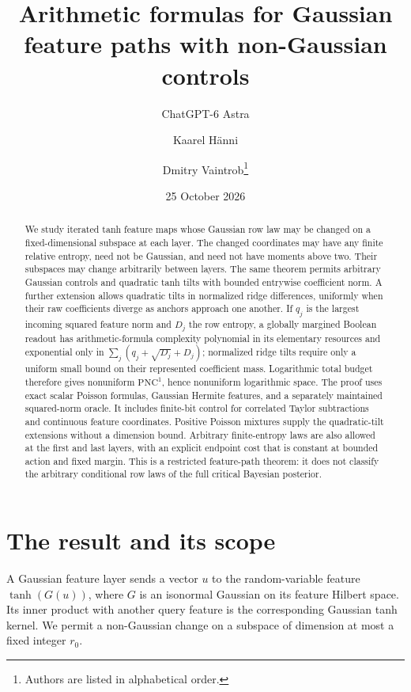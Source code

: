 \documentclass[11pt]{article}
\title{Arithmetic formulas for Gaussian feature paths with non-Gaussian controls}
\author{ChatGPT-6 Astra \and Kaarel H\"anni \and Dmitry Vaintrob\thanks{Authors are listed in alphabetical order.}}
\date{25 October 2026}
\newcommand{\PNC}{\mathrm{PNC}^{1}}
\begin{document}
\maketitle
\begin{abstract}
We study iterated tanh feature maps whose Gaussian row law may be changed on a fixed-dimensional subspace at each layer. The changed coordinates may have any finite relative entropy, need not be Gaussian, and need not have moments above two. Their subspaces may change arbitrarily between layers. The same theorem permits arbitrary Gaussian controls and quadratic tanh tilts with bounded entrywise coefficient norm. A further extension allows quadratic tilts in normalized ridge differences, uniformly when their raw coefficients diverge as anchors approach one another. If $q_j$ is the largest incoming squared feature norm and $D_j$ the row entropy, a globally margined Boolean readout has arithmetic-formula complexity polynomial in its elementary resources and exponential only in $\sum_j(q_j+\sqrt{D_j}+D_j)$; normalized ridge tilts require only a uniform small bound on their represented coefficient mass. Logarithmic total budget therefore gives nonuniform $\PNC$, hence nonuniform logarithmic space. The proof uses exact scalar Poisson formulas, Gaussian Hermite features, and a separately maintained squared-norm oracle. It includes finite-bit control for correlated Taylor subtractions and continuous feature coordinates. Positive Poisson mixtures supply the quadratic-tilt extensions without a dimension bound. Arbitrary finite-entropy laws are also allowed at the first and last layers, with an explicit endpoint cost that is constant at bounded action and fixed margin. This is a restricted feature-path theorem: it does not classify the arbitrary conditional row laws of the full critical Bayesian posterior.
\end{abstract}

\section{The result and its scope}
A Gaussian feature layer sends a vector $u$ to the random-variable feature $\tanh(G(u))$, where $G$ is an isonormal Gaussian on its feature Hilbert space. Its inner product with another query feature is the corresponding Gaussian tanh kernel. We permit a non-Gaussian change on a subspace of dimension at most a fixed integer $r_0$.
\end{document}

